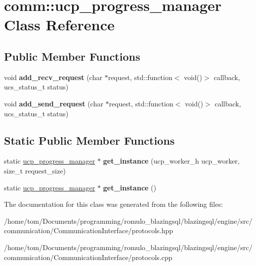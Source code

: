 \hypertarget{classcomm_1_1ucp__progress__manager}{}\section{comm\+:\+:ucp\+\_\+progress\+\_\+manager Class Reference}
\label{classcomm_1_1ucp__progress__manager}
\subsection*{Public Member Functions}
\begin{DoxyCompactItemize}
\item 
\mbox{\label{classcomm_1_1ucp__progress__manager_ab21182e05f50c7f455c40c1771e81cb2}} 
void {\bfseries add\+\_\+recv\+\_\+request} (char $\ast$request, std\+::function$<$ void()$>$ callback, ucs\+\_\+status\+\_\+t status)
\item 
\mbox{\label{classcomm_1_1ucp__progress__manager_aeb0629186a50f7b4058fd3fc2bf0e77e}} 
void {\bfseries add\+\_\+send\+\_\+request} (char $\ast$request, std\+::function$<$ void()$>$ callback, ucs\+\_\+status\+\_\+t status)
\end{DoxyCompactItemize}
\subsection*{Static Public Member Functions}
\begin{DoxyCompactItemize}
\item 
\mbox{\label{classcomm_1_1ucp__progress__manager_ae9d58e78cb6a2c107e792cb8eb4af1da}} 
static \hyperlink{classcomm_1_1ucp__progress__manager}{ucp\+\_\+progress\+\_\+manager} $\ast$ {\bfseries get\+\_\+instance} (ucp\+\_\+worker\+\_\+h ucp\+\_\+worker, size\+\_\+t request\+\_\+size)
\item 
\mbox{\label{classcomm_1_1ucp__progress__manager_a41a7db6262a5b894b86f5c74960a818c}} 
static \hyperlink{classcomm_1_1ucp__progress__manager}{ucp\+\_\+progress\+\_\+manager} $\ast$ {\bfseries get\+\_\+instance} ()
\end{DoxyCompactItemize}


The documentation for this class was generated from the following files\+:\begin{DoxyCompactItemize}
\item 
/home/tom/\+Documents/programming/romulo\+\_\+blazingsql/blazingsql/engine/src/communication/\+Communication\+Interface/protocols.\+hpp\item 
/home/tom/\+Documents/programming/romulo\+\_\+blazingsql/blazingsql/engine/src/communication/\+Communication\+Interface/protocols.\+cpp\end{DoxyCompactItemize}
